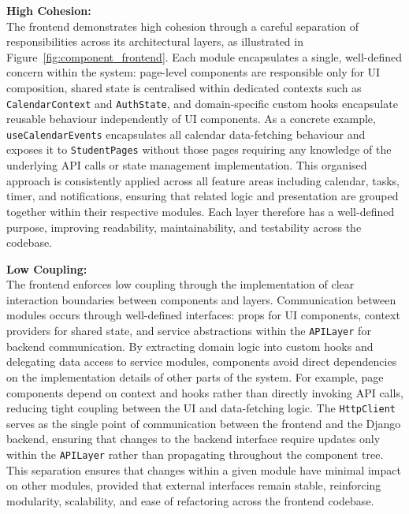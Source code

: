\textbf{High Cohesion:} \\
The frontend demonstrates high cohesion through a careful separation of responsibilities
across its architectural layers, as illustrated in Figure~\ref{fig:component_frontend}.
Each module encapsulates a single, well-defined concern within the system: page-level
components are responsible only for UI composition, shared state is centralised within
dedicated contexts such as \texttt{CalendarContext} and \texttt{AuthState}, and
domain-specific custom hooks encapsulate reusable behaviour independently of UI
components. As a concrete example, \texttt{useCalendarEvents} encapsulates all calendar
data-fetching behaviour and exposes it to \texttt{StudentPages} without those pages
requiring any knowledge of the underlying API calls or state management implementation.
This organised approach is consistently applied across all feature areas including
calendar, tasks, timer, and notifications, ensuring that related logic and presentation
are grouped together within their respective modules. Each layer therefore has a
well-defined purpose, improving readability, maintainability, and testability across the
codebase.

\vspace{0.5cm}

\textbf{Low Coupling:} \\
The frontend enforces low coupling through the implementation of clear interaction
boundaries between components and layers. Communication between modules occurs through
well-defined interfaces: props for UI components, context providers for shared state, and
service abstractions within the \texttt{APILayer} for backend communication. By extracting
domain logic into custom hooks and delegating data access to service modules, components
avoid direct dependencies on the implementation details of other parts of the system. For
example, page components depend on context and hooks rather than directly invoking API
calls, reducing tight coupling between the UI and data-fetching logic. The
\texttt{HttpClient} serves as the single point of communication between the frontend and
the Django backend, ensuring that changes to the backend interface require updates only
within the \texttt{APILayer} rather than propagating throughout the component tree. This
separation ensures that changes within a given module have minimal impact on other modules,
provided that external interfaces remain stable, reinforcing modularity, scalability, and
ease of refactoring across the frontend codebase.

